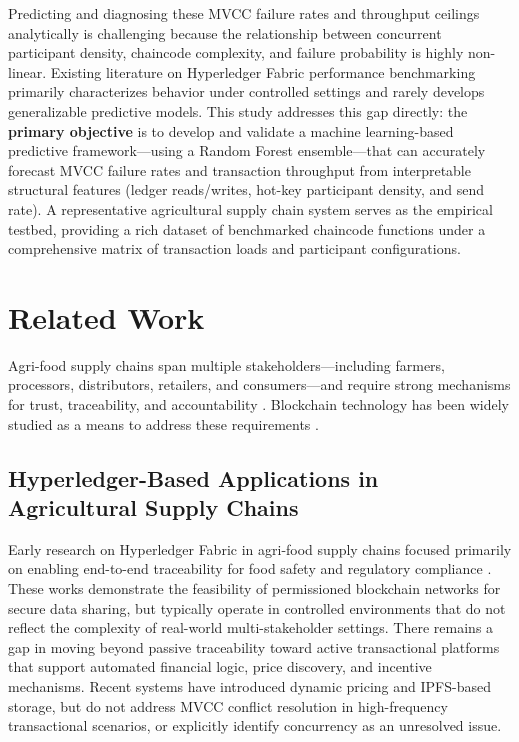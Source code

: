 \documentclass[12pt]{article}
\begin{document}
Predicting and diagnosing these MVCC failure rates and throughput ceilings analytically is challenging because the relationship between concurrent participant density, chaincode complexity, and failure probability is highly non-linear. Existing literature on Hyperledger Fabric performance benchmarking primarily characterizes behavior under controlled settings and rarely develops generalizable predictive models. This study addresses this gap directly: the \textbf{primary objective} is to develop and validate a machine learning-based predictive framework---using a Random Forest ensemble---that can accurately forecast MVCC failure rates and transaction throughput from interpretable structural features (ledger reads/writes, hot-key participant density, and send rate). A representative agricultural supply chain system serves as the empirical testbed, providing a rich dataset of benchmarked chaincode functions under a comprehensive matrix of transaction loads and participant configurations.
	
\section{Related Work}

Agri-food supply chains span multiple stakeholders---including farmers, processors, distributors, retailers, and consumers---and require strong mechanisms for trust, traceability, and accountability \citep{weerabahu_challenges_2022,nayal_antecedents_2021}. Blockchain technology has been widely studied as a means to address these requirements \citep{zhao_blockchain_2019,shahid_blockchain-based_2020}.

	\subsection{Hyperledger-Based Applications in Agricultural Supply Chains}
	
	Early research on Hyperledger Fabric in agri-food supply chains focused primarily on enabling end-to-end traceability for food safety and regulatory compliance \cite{marchese_blockchain-based_2022, zhang_information_2022, iftekhar_blockchain-based_2021, joo_evidence_2021}. These works demonstrate the feasibility of permissioned blockchain networks for secure data sharing, but typically operate in controlled environments that do not reflect the complexity of real-world multi-stakeholder settings. There remains a gap in moving beyond passive traceability toward active transactional platforms that support automated financial logic, price discovery, and incentive mechanisms. Recent systems \cite{rani_stp_2025, talib_blockchain-enabled_2026, zhang_blockchain-based_2023} have introduced dynamic pricing and IPFS-based storage, but do not address MVCC conflict resolution in high-frequency transactional scenarios, or explicitly identify concurrency as an unresolved issue.
	
\end{document}

